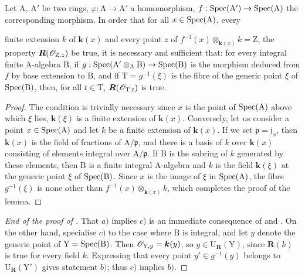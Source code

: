 \begin{lemma}[7.3.16.2]
\label{IV.7.3.16.2}
Let $\mathrm{A}$, $\mathrm{A}'$ be two rings, $\varphi:\mathrm{A}\to\mathrm{A}'$ a homomorphism, $f:\operatorname{Spec}(\mathrm{A}')\to\operatorname{Spec}(\mathrm{A})$ the corresponding morphism.
In order that for all $x\in\operatorname{Spec}(\mathrm{A})$, every


finite extension $k$ of $\boldsymbol{k}(x)$ and every point $z$ of $f^{-1}(x)\otimes_{\boldsymbol{k}(x)} k=\mathrm{Z}$, the property $\boldsymbol{R}(\mathscr{O}_{\mathrm{Z},z})$ be true, it is necessary and sufficient that: for every integral finite A-algebra $\mathrm{B}$, if $g:\operatorname{Spec}(\mathrm{A}'\otimes_\mathrm{A}\mathrm{B})\to\operatorname{Spec}(\mathrm{B})$ is the morphism deduced from $f$ by base extension to $\mathrm{B}$, and if $\mathrm{T}=g^{-1}(\xi)$ is the fibre of the generic point $\xi$ of $\operatorname{Spec}(\mathrm{B})$, then, for all $t\in\mathrm{T}$, $\boldsymbol{R}(\mathscr{O}_{\mathrm{T},t})$ is true.
\end{lemma}

\begin{proof}
The condition is trivially necessary since $x$ is the point of $\operatorname{Spec}(\mathrm{A})$ above which $\xi$ lies, $\boldsymbol{k}(\xi)$ is a finite extension of $\boldsymbol{k}(x)$.
Conversely, let us consider a point $x\in\operatorname{Spec}(\mathrm{A})$ and let $k$ be a finite extension of $\boldsymbol{k}(x)$.
If we set $\mathfrak{p}=\mathfrak{j}_x$, then $\boldsymbol{k}(x)$ is the field of fractions of $\mathrm{A}/\mathfrak{p}$, and there is a basis of $k$ over $\boldsymbol{k}(x)$ consisting of elements integral over $\mathrm{A}/\mathfrak{p}$.
If $\mathrm{B}$ is the subring of $k$ generated by these elements, then $\mathrm{B}$ is a finite integral $\mathrm{A}$-algebra and $k$ is the field $\boldsymbol{k}(\xi)$ at the generic point $\xi$ of $\operatorname{Spec}(\mathrm{B})$.
Since $x$ is the image of $\xi$ in $\operatorname{Spec}(\mathrm{A})$, the fibre $g^{-1}(\xi)$ is none other than $f^{-1}(x)\otimes_{\boldsymbol{k}(x)}k$, which completes the proof of the lemma.
\end{proof}

\begin{proof}[End of the proof of ]
That $a)$ implies $c)$ is an immediate consequence of  and .
On the other hand, specialise $c)$ to the case where $\mathrm{B}$ is integral, and let $y$ denote the generic point of $\mathrm{Y}=\operatorname{Spec}(\mathrm{B})$.
Then $\mathscr{O}_{\mathrm{Y},y}=\boldsymbol{k}(y)$, so $y\in\mathrm{U}_{\boldsymbol{R}}(\mathrm{Y})$, since $\boldsymbol{R}(k)$ is true for every field $k$.
Expressing that every point $y'\in g^{-1}(y)$ belongs to $\mathrm{U}_{\boldsymbol{R}}(\mathrm{Y}')$ gives statement $b)$; thus $c)$ implies $b)$.
\end{proof}

